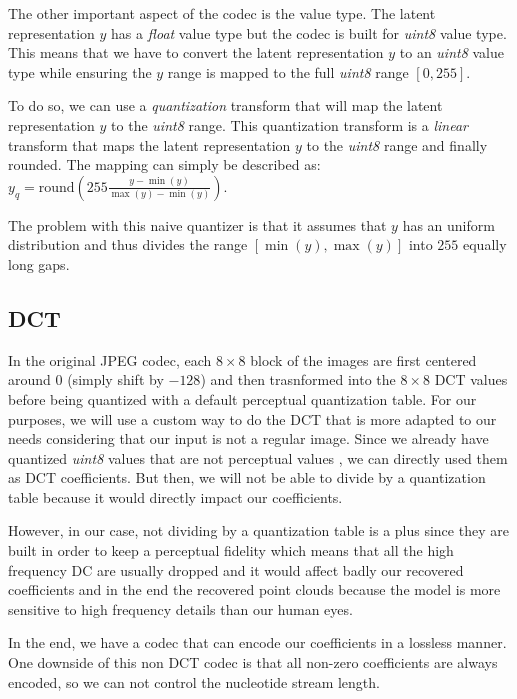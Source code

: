 The other important aspect of the codec is the value type. The latent representation $y$ has a \textit{float} value type but the codec is built for \textit{uint8} value type. This means that we have to convert the latent representation $y$ to an \textit{uint8} value type while ensuring the $y$ range is mapped to the full \textit{uint8} range $[0, 255]$. 

To do so, we can use a \textit{quantization} transform that will map the latent representation $y$ to the \textit{uint8} range. This quantization transform is a \textit{linear} transform that maps the latent representation $y$ to the \textit{uint8} range and finally rounded.
The mapping can simply be described as: $y_q = \text{round} \left(255 \frac{y - \min(y)}{\max(y) - \min(y)}\right)$.

The problem with this naive quantizer is that it assumes that $y$ has an uniform distribution and thus divides the range $[{\min(y), \max(y)}]$ into $255$ equally long gaps. 

\subsection{DCT}

In the original JPEG codec, each $8 \times 8$ block of the images are first centered around $0$ (simply shift by $-128$) and then trasnformed into the $8 \times 8$ DCT values before being quantized with a default perceptual quantization table. 
For our purposes, we will use a custom way to do the DCT that is more adapted to our needs considering that our input is not a regular image.
Since we already have quantized \textit{uint8} values that are not perceptual values , we can directly used them as DCT coefficients.  
But then, we will not be able to divide by a quantization table because it would directly impact our coefficients. 

However, in our case, not dividing by a quantization table is a plus since they are built in order to keep a perceptual fidelity which means that all the high frequency DC are usually dropped and it would affect badly our recovered coefficients and in the end the recovered point clouds because the model is more sensitive to high frequency details than our human eyes.

In the end, we have a codec that can encode our coefficients in a lossless manner. One downside of this non DCT codec is that all non-zero coefficients are always encoded, so we can not control the nucleotide stream length.

